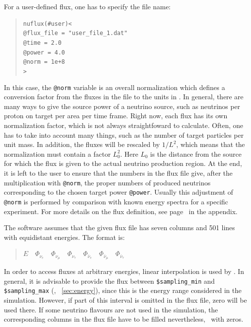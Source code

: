 %
For a user-defined flux, one has to specify the file name:
\begin{quote}
{\tt nuflux(\#user)<}\\
{\tt \tb @flux\_file = "user\_file\_1.dat"\\
\tb @time = 2.0\\
\tb @power = 4.0\\
\tb @norm = 1e+8}\\
{\tt >}
\end{quote}
In this case, the {\tt @norm} variable is an overall normalization which defines a conversion factor from the fluxes in the file to the units in \GLOBES . In general, there are many ways to give the source power of a 
neutrino source, such as neutrinos per proton on target per area per time frame. Right now, each flux has its own normalization factor, which is
not always straightfoward to calculate. Often, one has to take into account
many things, such as the number of target particles per unit mass. 
In addition, the fluxes will be rescaled by $1/L^2$, which means that the
normalization must contain a factor $L_0^2$. Here $L_0$ is the distance from the source for which the flux is given to the actual neutrino production region. At the end, it is left to the user to ensure that the 
numbers in the flux file give, after the multiplication with {\tt @norm}, 
the proper numbers of produced neutrinos corresponding to the chosen target power {\tt @power}. Usually this adjustment of {\tt @norm} is performed by comparison with known energy spectra for a specific experiment.
For more details on the flux definition, see page~\pageref{app:flux} in the appendix.

The software assumes that the given flux file has seven columns and
501 lines with equidistant energies. The format is:
\begin{quotation}
$ E\quad
\Phi_{\nu_e}\quad
\Phi_{\nu_\mu}\quad
\Phi_{\nu_\tau}\quad
\Phi_{\bar\nu_e}\quad
\Phi_{\bar\nu_\mu}\quad
\Phi_{\bar\nu_\tau}$
\end{quotation}
In order to access fluxes at arbitrary energies, linear interpolation 
is used by \GLOBES. In general, it is advisable to provide the flux
between {\tt \$sampling\_min} and {\tt \$sampling\_max} (\cf, \Sec~\ref{sec:energy}),
since this is the energy range considered in the simulation. However,
if part of this interval is omitted in the flux file, zero will be
used there. If some neutrino flavours are not used in the simulation,
the corresponding columns in the flux file have to be filled nevertheless,
\eg\ with zeros. 

